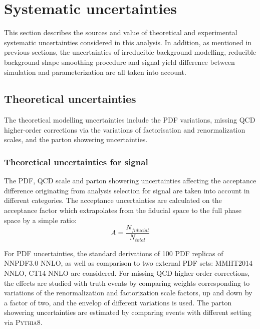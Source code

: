 \section{Systematic uncertainties}
\label{sec:hmhzz_sys}

This section describes the sources and value of theoretical and experimental systematic uncertainties considered in this analysis.
In addition, as mentioned in previous sections, the uncertainties of irreducible background modelling, reducible background shape smoothing procedure and signal yield difference between simulation and parameterization are all taken into account.

\subsection{Theoretical uncertainties}

The theoretical modelling uncertainties include the PDF variations, missing QCD higher-order corrections via the variations of factorisation and renormalization scales,
and the parton showering uncertainties.

\subsubsection{Theoretical uncertainties for signal}
\label{sec:hmhzz_theo_signal}

The PDF, QCD scale and parton showering uncertainties affecting the acceptance difference originating from analysis selection for signal are taken into account in different categories.
The acceptance uncertainties are calculated on the acceptance factor which extrapolates from the fiducial space to the full phase space by a simple ratio:
\begin{equation}
        A = \frac{N_{fiducial}}{N_{total}}
\end{equation}

For PDF uncertainties, the standard derivations of 100 PDF replicas of NNPDF3.0 NNLO, as well as comparison to two external PDF sets: MMHT2014 NNLO, CT14 NNLO are considered.
For missing QCD higher-order corrections, the effects are studied with truth events by comparing weights corresponding to
variations of the renormalization and factorization scale factors, up and down by a factor of two, and the envelop of different variations is used.
The parton showering uncertainties are estimated by comparing events with different setting via \textsc{Pythia8}.

